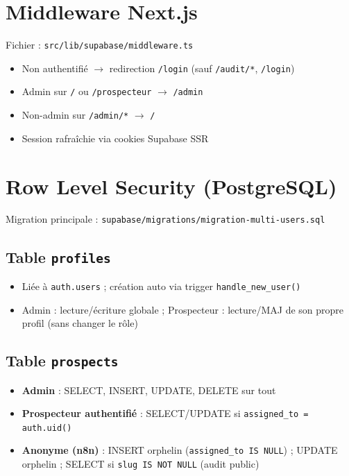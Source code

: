 \documentclass[11pt,a4paper]{report}
\begin{document}
\section{Middleware Next.js}

Fichier : \texttt{src/lib/supabase/middleware.ts}

\begin{itemize}[noitemsep]
  \item Non authentifié $\rightarrow$ redirection \texttt{/login} (sauf \texttt{/audit/*}, \texttt{/login})
  \item Admin sur \texttt{/} ou \texttt{/prospecteur} $\rightarrow$ \texttt{/admin}
  \item Non-admin sur \texttt{/admin/*} $\rightarrow$ \texttt{/}
  \item Session rafraîchie via cookies Supabase SSR
\end{itemize}

\section{Row Level Security (PostgreSQL)}

Migration principale : \texttt{supabase/migrations/migration-multi-users.sql}

\subsection{Table \texttt{profiles}}
\begin{itemize}[noitemsep]
  \item Liée à \texttt{auth.users} ; création auto via trigger \texttt{handle\_new\_user()}
  \item Admin : lecture/écriture globale ; Prospecteur : lecture/MAJ de son propre profil (sans changer le rôle)
\end{itemize}

\subsection{Table \texttt{prospects}}
\begin{itemize}[noitemsep]
  \item \textbf{Admin} : SELECT, INSERT, UPDATE, DELETE sur tout
  \item \textbf{Prospecteur authentifié} : SELECT/UPDATE si \texttt{assigned\_to = auth.uid()}
  \item \textbf{Anonyme (n8n)} : INSERT orphelin (\texttt{assigned\_to IS NULL}) ; UPDATE orphelin ; SELECT si \texttt{slug IS NOT NULL} (audit public)
\end{itemize}
\end{document}
